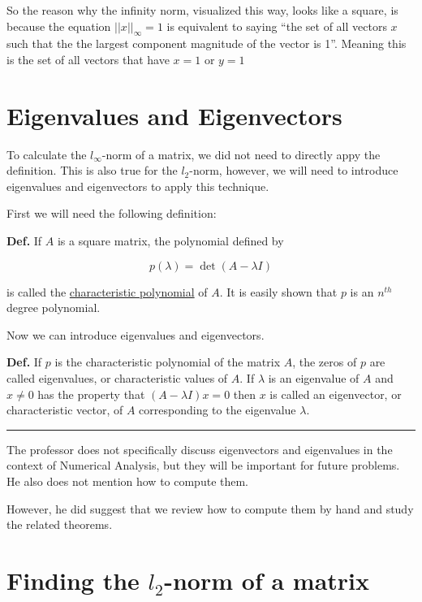 So the reason why the infinity norm, visualized this way,
looks like a square, is because the equation $||x||_\infty = 1$ is equivalent 
to saying \enquote{the set of all vectors $x$ such that the the largest 
component magnitude of the vector is 1}. Meaning this is the set of all vectors
that have $x=1$ or $y=1$

\section{Eigenvalues and Eigenvectors} %

To calculate the $l_\infty$-norm of a matrix, we did not need to directly
appy the definition. This is also true for the $l_2$-norm, however, we will need
to introduce eigenvalues and eigenvectors to apply this technique.

First we will need the following definition:

\noindent
\textbf{Def.} If $A$ is a square matrix, the polynomial defined by

\begin{equation*}
  p(\lambda) = \det(A-\lambda I)
\end{equation*}

\noindent
\hangindent=0.5cm
is called the \uline{characteristic polynomial} of $A$. It is easily shown that
$p$ is an $n^{th}$ degree polynomial.

Now we can introduce eigenvalues and eigenvectors.

\noindent
\hangindent=0.5cm
\textbf{Def.} If $p$ is the characteristic polynomial of the matrix $A$, the
zeros of $p$ are called eigenvalues, or characteristic values of $A$. If $
\lambda$ is an eigenvalue of $A$ and $x\ne 0$ has the property that 
$(A-\lambda I)x = 0$ then $x$ is called an eigenvector, or characteristic
vector, of $A$ corresponding to the eigenvalue $\lambda$.

\noindent\rule{\linewidth}{0.5pt}

The professor does not specifically discuss eigenvectors and eigenvalues in the
context of Numerical Analysis, but they will be important for future problems.
He also does not mention how to compute them.

However, he did suggest that we review how to compute them by hand and study 
the related theorems.

\section{Finding the $l_2$-norm of a matrix}

